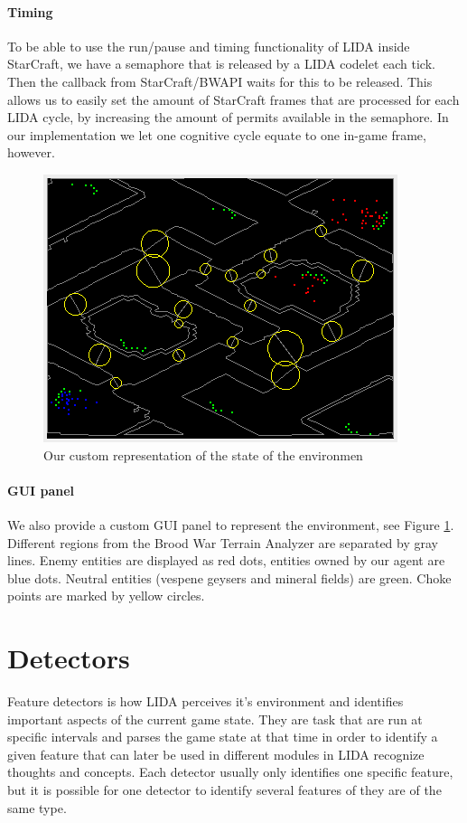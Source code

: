 \paragraph{Timing} To be able to use the run/pause and timing functionality of LIDA inside StarCraft, we have a semaphore that is released by a LIDA codelet each tick. Then the callback from StarCraft/BWAPI waits for this to be released. This allows us to easily set the amount of StarCraft frames that are processed for each LIDA cycle, by increasing the amount of permits available in the semaphore. In our implementation we let one cognitive cycle equate to one in-game frame, however.
\begin{figure}[h!tb]
\centering
\includegraphics{graphics/environment-gui.png}
\caption{Our custom representation of the state of the environmen}
\label{fig:environment-gui}
\end{figure}
\paragraph{GUI panel} We also provide a custom GUI panel to represent the environment, see Figure \ref{fig:environment-gui}. Different regions from the Brood War Terrain Analyzer are separated by gray lines. Enemy entities are displayed as red dots, entities owned by our agent are blue dots. Neutral entities (vespene geysers and mineral fields) are green. Choke points are marked by yellow circles.


\section{Detectors}
\label{sec:detectors}
Feature detectors is how LIDA perceives it's environment and identifies important aspects of the current game state. They are task that are run at specific intervals and parses the game state at that time in order to identify a given feature that can later be used in different modules in LIDA recognize thoughts and concepts. Each detector usually only identifies one specific feature, but it is possible for one detector to identify several features of they are of the same type. 

